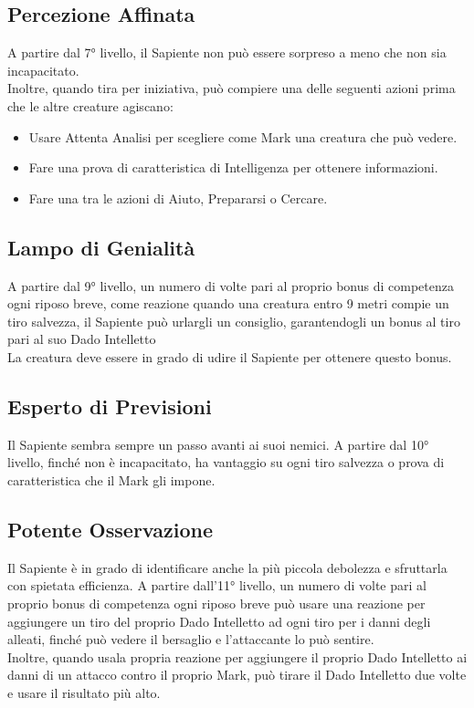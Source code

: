 \subsection{Percezione Affinata}
A partire dal 7° livello, il Sapiente non può essere sorpreso a meno che non sia incapacitato.\\
Inoltre, quando tira per iniziativa, può compiere una delle seguenti azioni prima che le altre creature agiscano:
\begin{itemize}
    \item Usare Attenta Analisi per scegliere come Mark una creatura che può vedere.
    \item Fare una prova di caratteristica di Intelligenza per ottenere informazioni.
    \item Fare una tra le azioni di Aiuto,  Prepararsi o Cercare.
\end{itemize}

\subsection{Lampo di Genialità}
A partire dal 9° livello, un numero di volte pari al proprio bonus di competenza ogni riposo breve, come reazione quando una creatura entro 9 metri compie un tiro salvezza, il Sapiente può urlargli un consiglio, garantendogli un bonus al tiro pari al suo Dado Intelletto\\
La creatura deve essere in grado di udire il Sapiente per ottenere questo bonus.

\subsection{Esperto di Previsioni}
Il Sapiente sembra sempre un passo avanti ai suoi nemici. A partire dal 10° livello, finché non è incapacitato, ha vantaggio su ogni tiro salvezza o prova di caratteristica che il Mark gli impone.

\subsection{Potente Osservazione}
Il Sapiente è in grado di identificare anche la più piccola debolezza e sfruttarla con spietata efficienza. A partire dall'11° livello, un numero di volte pari al proprio bonus di competenza ogni riposo breve può usare una reazione per aggiungere un tiro del proprio Dado Intelletto ad ogni tiro per i danni degli alleati, finché può vedere il bersaglio e l'attaccante lo può sentire.\\
Inoltre, quando usala propria reazione per aggiungere il proprio Dado Intelletto ai danni di un attacco contro il proprio Mark, può tirare il Dado Intelletto due volte e usare il risultato più alto.

